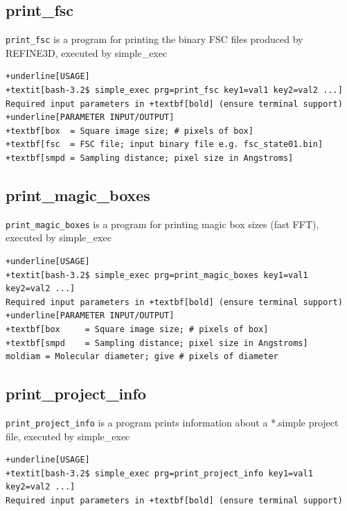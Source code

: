 \documentclass[a4paper,11pt]{article}
\newcommand{\prgname}[1]{\textcolor{NavyBlue}{\texttt{#1}}}
\begin{document}
\subsection{print\_fsc}
\label{print_fsc}
\prgname{print\_fsc} is a program for printing the binary FSC files produced by REFINE3D, executed by simple\_exec
\begin{Verbatim}[commandchars=+\[\],fontsize=\small,breaklines=true]
+underline[USAGE]
+textit[bash-3.2$ simple_exec prg=print_fsc key1=val1 key2=val2 ...]
Required input parameters in +textbf[bold] (ensure terminal support)
+underline[PARAMETER INPUT/OUTPUT]
+textbf[box  = Square image size; # pixels of box]
+textbf[fsc  = FSC file; input binary file e.g. fsc_state01.bin]
+textbf[smpd = Sampling distance; pixel size in Angstroms]
\end{Verbatim}

\subsection{print\_magic\_boxes}
\label{print_magic_boxes}
\prgname{print\_magic\_boxes} is a program for printing magic box sizes (fast FFT), executed by simple\_exec
\begin{Verbatim}[commandchars=+\[\],fontsize=\small,breaklines=true]
+underline[USAGE]
+textit[bash-3.2$ simple_exec prg=print_magic_boxes key1=val1 key2=val2 ...]
Required input parameters in +textbf[bold] (ensure terminal support)
+underline[PARAMETER INPUT/OUTPUT]
+textbf[box     = Square image size; # pixels of box]
+textbf[smpd    = Sampling distance; pixel size in Angstroms]
moldiam = Molecular diameter; give # pixels of diameter
\end{Verbatim}

\subsection{print\_project\_info}
\label{print_project_info}
\prgname{print\_project\_info} is a program prints information about a *.simple project file, executed by simple\_exec
\begin{Verbatim}[commandchars=+\[\],fontsize=\small,breaklines=true]
+underline[USAGE]
+textit[bash-3.2$ simple_exec prg=print_project_info key1=val1 key2=val2 ...]
Required input parameters in +textbf[bold] (ensure terminal support)
\end{Verbatim}
\end{document}
